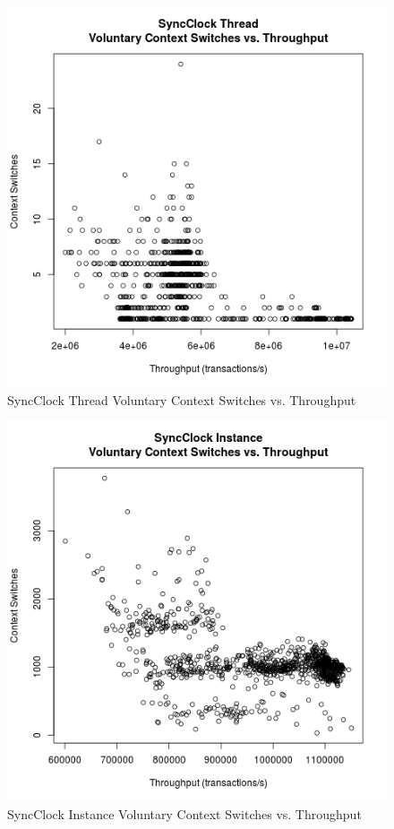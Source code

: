 \begin{figure}
\center
\includegraphics[height=.4\textheight]{sync_thread_throughput_context.png}
\caption{SyncClock Thread Voluntary Context Switches vs. Throughput}
\label{sync_thread_throughput_context}
\end{figure}

\begin{figure}
\center
\includegraphics[height=.4\textheight]{sync_instance_throughput_context.png}
\caption{SyncClock Instance Voluntary Context Switches vs. Throughput}
\label{sync_instance_throughput_context}
\end{figure}

